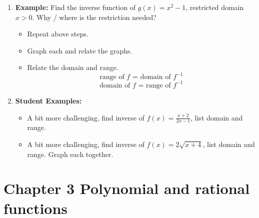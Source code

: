 \documentclass{article}
\begin{document}
\begin{enumerate}
\item {\bf Example:} Find the inverse function of $g(x)=x^2-1$, restricted domain $x>0$. Why / where is the restriction needed?
\begin{itemize}
\item Repeat above steps.
\item Graph each and relate the graphs.
\item Relate the domain and range. 
$$\text{range of $f$ = domain of $f^{-1}$}$$
$$\text{domain of $f$ = range of $f^{-1}$}$$
\end{itemize}

\item {\bf Student Examples:}  
\begin{itemize}
\item A bit more challenging, find inverse of $f(x)  = \frac{x+2}{2x-1}$, list domain and range.
\item A bit more challenging, find inverse of $f(x)  = 2\sqrt{x+4}$, list domain and range. Graph each together.
\end{itemize}

\end{enumerate}



\section{Chapter 3 Polynomial and rational functions}

\end{document}
